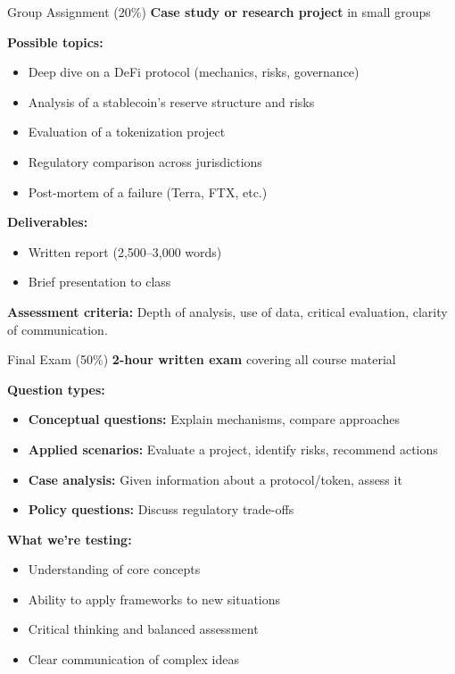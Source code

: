 \documentclass[10pt]{beamer}
\begin{document}
\begin{frame}{Group Assignment (20\%)}
  \textbf{Case study or research project} in small groups
  
  \vspace{1em}
  \textbf{Possible topics:}
  \begin{itemize}
    \item Deep dive on a DeFi protocol (mechanics, risks, governance)
    \item Analysis of a stablecoin's reserve structure and risks
    \item Evaluation of a tokenization project
    \item Regulatory comparison across jurisdictions
    \item Post-mortem of a failure (Terra, FTX, etc.)
  \end{itemize}
  
  \vspace{1em}
  \textbf{Deliverables:}
  \begin{itemize}
    \item Written report (2,500--3,000 words)
    \item Brief presentation to class
  \end{itemize}
  
  \vspace{1em}
  \textbf{Assessment criteria:} Depth of analysis, use of data, critical evaluation, clarity of communication.
\end{frame}

\begin{frame}{Final Exam (50\%)}
  \textbf{2-hour written exam} covering all course material
  
  \vspace{1em}
  \textbf{Question types:}
  \begin{itemize}
    \item \textbf{Conceptual questions:} Explain mechanisms, compare approaches
    \item \textbf{Applied scenarios:} Evaluate a project, identify risks, recommend actions
    \item \textbf{Case analysis:} Given information about a protocol/token, assess it
    \item \textbf{Policy questions:} Discuss regulatory trade-offs
  \end{itemize}
  
  \vspace{1em}
  \textbf{What we're testing:}
  \begin{itemize}
    \item Understanding of core concepts
    \item Ability to apply frameworks to new situations
    \item Critical thinking and balanced assessment
    \item Clear communication of complex ideas
  \end{itemize}
\end{frame}
\end{document}

